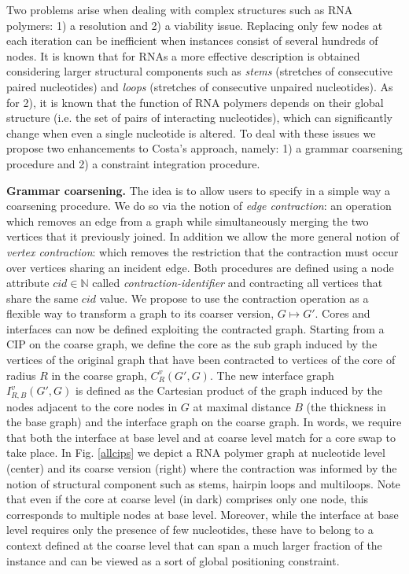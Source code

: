 \documentclass{article}
\newcommand*{\IN}[0]{\ensuremath{\mathbb{N}}}
\begin{document}
Two problems arise when dealing with complex structures such as RNA polymers:
1) a resolution and 2) a viability issue. Replacing only few nodes at each
iteration can be inefficient when instances consist of several hundreds of
nodes. It is known that for RNAs a more effective description is obtained
considering larger structural components such as {\em stems} (stretches of
consecutive paired nucleotides) and {\em loops} (stretches of consecutive
unpaired nucleotides). As for 2), it is known that the function of RNA
polymers depends on their global structure (i.e. the set of pairs of
interacting nucleotides), which can significantly change when even a single
nucleotide is altered. To deal with these issues we propose two enhancements
to Costa's approach, namely: 1) a grammar coarsening procedure and
2) a constraint integration procedure.


\textbf{Grammar coarsening.} The idea is to allow users to specify in a simple
way a coarsening procedure. We do so via the notion of {\em edge contraction}:
an operation which removes an edge from a graph while simultaneously merging
the two vertices that it previously joined. In addition we allow the more
general notion of {\em vertex contraction}: which removes the restriction that
the contraction must occur over vertices sharing an incident edge. Both
procedures are defined using a node attribute $cid \in \IN$ called {\em
contraction-identifier} and contracting all vertices that share the same $cid$
value. We propose to use the contraction operation as a flexible way to
transform a graph to its coarser version, $G \mapsto G'$. Cores and interfaces
can now be defined exploiting the contracted graph. Starting from a CIP on the
coarse graph, we define the core as the sub graph induced by the vertices of
the original graph that have been contracted to vertices of the core of radius
$R$ in the coarse graph, $C_R^v(G',G)$.  The new interface graph
$I_{R,B}^v(G',G)$ is defined as the Cartesian product of the graph induced by
the nodes adjacent to the core nodes in $G$ at maximal distance $B$ (the
thickness in the base graph) and the interface graph on the coarse graph. In
words, we require that both the interface at base level and at coarse level
match for a core swap to take place. In Fig. \ref{allcips}  we depict a RNA
polymer graph at nucleotide level (center) and its coarse version (right)
where the contraction was informed by the notion of structural component such
as stems, hairpin loops and multiloops. Note that even if the core at coarse
level (in dark) comprises only one node, this corresponds to multiple nodes at
base level. Moreover, while the interface at base level requires only the
presence of few nucleotides, these have to belong to a context defined at the
coarse level that can span a much larger fraction of the instance and can be
viewed as a sort of global positioning constraint.
\end{document}
